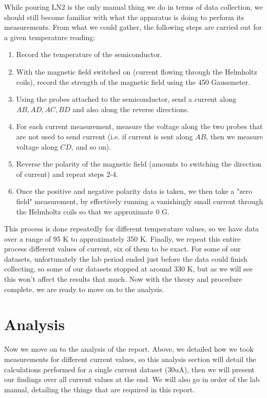 \documentclass[10pt]{article}
\begin{document}
	While pouring LN2 is the only manual thing we do in terms of data collection, we should still become
	familiar with what the apparatus is doing to perform its measurements. From what we could gather, the
	following steps are carried out for a given temperature reading:
	\begin{enumerate}[label = \arabic*.]
		\item Record the temperature of the semiconductor.
		\item With the magnetic field switched on (current flowing through the Helmholtz coils), 
			record the strength of the magnetic field using the 450
			Gaussmeter.
		\item Using the probes attached to the semiconductor, send a current along \( AB, AD, AC, BD \) and
			also along the reverse directions.  
		\item For each current measurement, measure the voltage along the two probes that are not used to
			send current (i.e. if current is sent along \( AB \), then we measure voltage along \( CD \), and so on).
		\item Reverse the polarity of the magnetic field (amounts to switching the direction of current) and
			repeat steps 2-4. 
		\item Once the positive and negative polarity data is taken, we then take a "zero field" measurement,
			by effectively running a vanishingly small current through the Helmholtz coils so that we
			approximate 0 G.  
	\end{enumerate}
	This process is done repeatedly for different temperature values, so we have data over a range of
	95 K to approximately 350 K. Finally, we repeat this entire process different values of current, six of
	them to be exact. For some of our datasets, unfortunately the lab period ended just before the data could
	finish collecting, so some of our datasets stopped at around 330 K, but as we will see this won't
	affect the results that much. Now with the theory and procedure complete, we are ready to move on to the
	analysis. 

	\section{Analysis}
	Now we move on to the analysis of the report. Above, we detailed how we took measurements for different
	current values, so this analysis section will detail the calculations performed for a single current
	dataset (30uA), then we will present our findings over all current values at the end. We will also go in order
	of the lab manual, detailing the things that are required in this report. 
\end{document}
